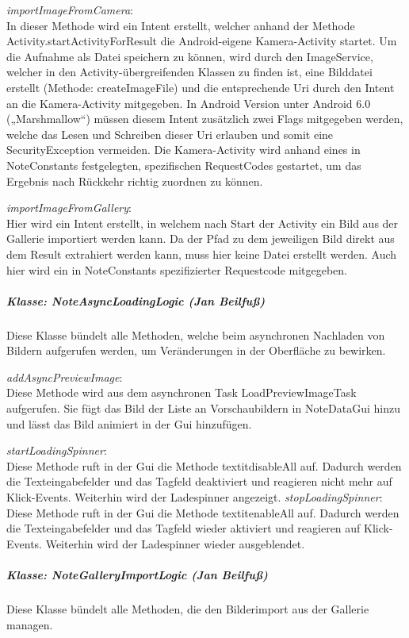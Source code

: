 \textit{importImageFromCamera}:\\
In dieser Methode wird ein Intent erstellt, welcher anhand der Methode Activity.startActivityForResult die Android-eigene Kamera-Activity startet. Um die Aufnahme als Datei speichern zu können, wird durch den ImageService, welcher in den Activity-übergreifenden Klassen zu finden ist, eine Bilddatei erstellt (Methode: createImageFile) und die entsprechende Uri durch den Intent an die Kamera-Activity mitgegeben. In Android Version unter Android 6.0 („Marshmallow“) müssen diesem Intent zusätzlich zwei Flags mitgegeben werden, welche das Lesen und Schreiben dieser Uri erlauben und somit eine SecurityException vermeiden.
Die Kamera-Activity wird anhand eines in NoteConstants festgelegten, spezifischen RequestCodes gestartet, um das Ergebnis nach Rückkehr richtig zuordnen zu können.

\textit{importImageFromGallery}:\\
Hier wird ein Intent erstellt, in welchem nach Start der Activity ein Bild aus der Gallerie importiert werden kann. Da der Pfad zu dem jeweiligen Bild direkt aus dem Result extrahiert werden kann, muss hier keine Datei erstellt werden. Auch hier wird ein in NoteConstants spezifizierter Requestcode mitgegeben. 

\subparagraph*{Klasse: NoteAsyncLoadingLogic (Jan Beilfuß)}
Diese Klasse bündelt alle Methoden, welche beim asynchronen Nachladen von Bildern aufgerufen werden, um Veränderungen in der Oberfläche zu bewirken.

\textit{addAsyncPreviewImage}:\\
Diese Methode wird aus dem asynchronen Task LoadPreviewImageTask aufgerufen. Sie fügt das Bild der Liste an Vorschaubildern in NoteDataGui hinzu und lässt das Bild animiert in der Gui hinzufügen.

\textit{startLoadingSpinner}:\\
Diese Methode ruft in der Gui die Methode textit{disableAll} auf. Dadurch werden die Texteingabefelder und das Tagfeld deaktiviert und reagieren nicht mehr auf Klick-Events. Weiterhin wird der Ladespinner angezeigt.
\textit{stopLoadingSpinner}:\\
Diese Methode ruft in der Gui die Methode textit{enableAll} auf. Dadurch werden die Texteingabefelder und das Tagfeld wieder aktiviert und reagieren auf Klick-Events. Weiterhin wird der Ladespinner wieder ausgeblendet.

\subparagraph*{Klasse: NoteGalleryImportLogic (Jan Beilfuß)}
Diese Klasse bündelt alle Methoden, die den Bilderimport aus der Gallerie managen.

